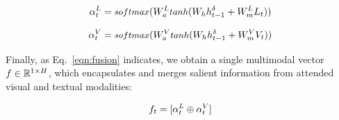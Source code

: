 \documentclass[11pt,a4paper]{article}
\newcommand{\R}{\mathbb{R}}
\begin{document}
\begin{equation}
  \alpha_t\sp{L} = \text{\small $softmax$}( W_a\sp{L} \text{\small $tanh$} (W_h h\sp{\delta}_{t-1} + W_{m}\sp{L} L_t) )
\label{eqn:fusionT}
\end{equation}

\begin{equation}
  \alpha_t\sp{V} = \text{\small $softmax$}( W_a\sp{V} \text{\small $tanh$} (W_h h\sp{\delta}_{t-1} + W_{m}\sp{V} V_t) )
\label{eqn:fusionV}
\end{equation}

Finally, as Eq.~\ref{eqn:fusion} indicates, we obtain a single multimodal vector $f \in \R\sp{1 \times H}$, which encapsulates and merges salient information from attended visual and textual modalities:

\begin{equation}
	f_t = [ \alpha_t\sp{L} \oplus \alpha_t\sp{V} ]
\label{eqn:fusion}
\end{equation}

\end{document}
